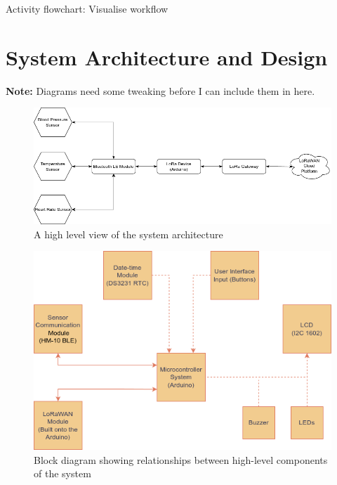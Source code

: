 Activity flowchart: Visualise workflow

\section{System Architecture and Design} %
\textbf{Note:} Diagrams need some tweaking before I can include them in here.

\begin{figure}[H]
\centering
\includegraphics[scale=0.5]{images/high_level_architecture}
\caption{A high level view of the system architecture}
\label{fig:high_level_architecture_diagram}
\end{figure}

\begin{figure}[H]
\centering
\includegraphics[scale=0.6]{images/block_diagram}
\caption{Block diagram showing relationships between high-level components of the system}
\label{fig:block_diagram}
\end{figure}

